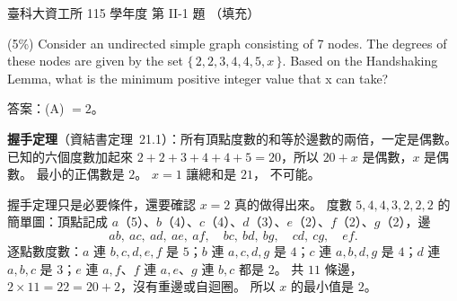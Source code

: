 \begin{pastexam}[label={px:ntust-115-ice-09}]{臺科大資工所 115 學年度 第 II-1 題}
（填充）

(5\%) Consider an undirected simple graph consisting of 7 nodes. The degrees of these nodes are given by the
set $\{\,2,2,3,4,4,5,x\,\}$. Based on the Handshaking Lemma, what is the minimum positive integer value that x
can take? 
\end{pastexam}

\begin{pastsoln}
答案：(A) $= 2$。

\textbf{握手定理}（資結書定理~21.1）：所有頂點度數的和等於邊數的兩倍，一定是偶數。 已知的六個度數加起來
$2 + 2 + 3 + 4 + 4 + 5 = 20$，所以 $20 + x$ 是偶數，$x$ 是偶數。 最小的正偶數是 $2$。 $x = 1$ 讓總和是 $21$，
不可能。

握手定理只是必要條件，還要確認 $x = 2$ 真的做得出來。 度數 $5, 4, 4, 3, 2, 2, 2$ 的簡單圖：頂點記成
$a$（5）、$b$（4）、$c$（4）、$d$（3）、$e$（2）、$f$（2）、$g$（2），邊
\[
ab,\ ac,\ ad,\ ae,\ af,\quad bc,\ bd,\ bg,\quad cd,\ cg,\quad ef .
\]
逐點數度數：$a$ 連 $b, c, d, e, f$ 是 $5$；$b$ 連 $a, c, d, g$ 是 $4$；$c$ 連 $a, b, d, g$ 是 $4$；$d$ 連 $a, b, c$ 是
$3$；$e$ 連 $a, f$、$f$ 連 $a, e$、$g$ 連 $b, c$ 都是 $2$。 共 $11$ 條邊，$2 \times 11 = 22 = 20 + 2$，沒有重邊或自迴圈。
所以 $x$ 的最小值是 $2$。
\end{pastsoln}

